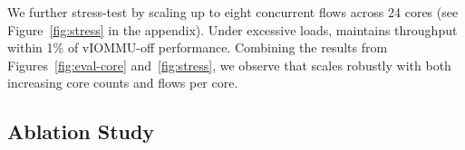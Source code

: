 We further stress-test \name{} by scaling up to eight concurrent flows across 24 cores (see Figure~\ref{fig:stress}
    in the appendix).
Under excessive loads, \name{} maintains throughput within 1\% of vIOMMU-off performance.
Combining the results from Figures~\ref{fig:eval-core} and~\ref{fig:stress}, 
we observe that \name{} scales robustly with both increasing core counts and flows per core. 
\fi









\subsection{{\name} Ablation Study}
\label{ssec:ablation}

